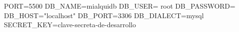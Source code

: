 PORT=5500
DB_NAME=mialquidb
DB_USER= root
DB_PASSWORD=
DB_HOST="localhost"
DB_PORT=3306
DB_DIALECT=mysql
SECRET_KEY=clave-secreta-de-desarrollo